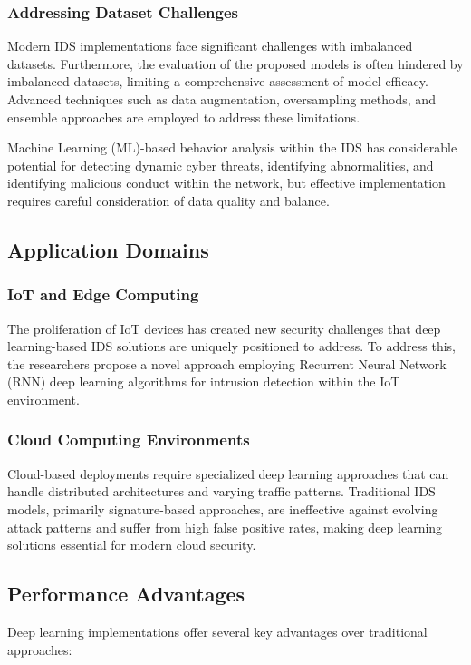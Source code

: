 \documentclass[16pt]{report}
\begin{document}
\subsubsection{Addressing Dataset Challenges}
Modern IDS implementations face significant challenges with imbalanced datasets. Furthermore, the evaluation of the proposed models is often hindered by imbalanced datasets, limiting a comprehensive assessment of model efficacy. Advanced techniques such as data augmentation, oversampling methods, and ensemble approaches are employed to address these limitations.

Machine Learning (ML)-based behavior analysis within the IDS has considerable potential for detecting dynamic cyber threats, identifying abnormalities, and identifying malicious conduct within the network, but effective implementation requires careful consideration of data quality and balance.

\subsection{Application Domains}

\subsubsection{IoT and Edge Computing}
The proliferation of IoT devices has created new security challenges that deep learning-based IDS solutions are uniquely positioned to address. To address this, the researchers propose a novel approach employing Recurrent Neural Network (RNN) deep learning algorithms for intrusion detection within the IoT environment.

\subsubsection{Cloud Computing Environments}
Cloud-based deployments require specialized deep learning approaches that can handle distributed architectures and varying traffic patterns. Traditional IDS models, primarily signature-based approaches, are ineffective against evolving attack patterns and suffer from high false positive rates, making deep learning solutions essential for modern cloud security.

\subsection{Performance Advantages}
Deep learning implementations offer several key advantages over traditional approaches:
\end{document}
